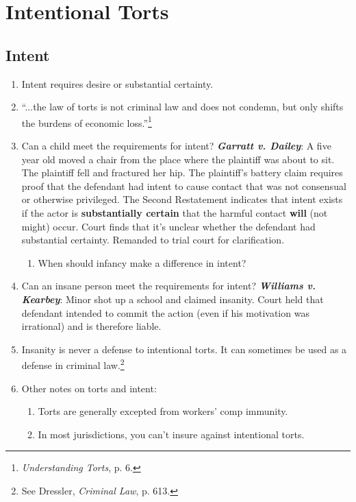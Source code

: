 \section{Intentional Torts}

\subsection{Intent}

\begin{enumerate}
    \item Intent requires desire or substantial certainty.
    \item ``...the law of torts is not criminal law and does not condemn, but only shifts the burdens of economic loss.''\footnote{\emph{Understanding Torts}, p. 6.}
    \item Can a child meet the requirements for intent? \textbf{\emph{Garratt v. Dailey}}: A five year old moved a chair from the place where the plaintiff was about to sit. The plaintiff fell and fractured her hip. The plaintiff's battery claim requires proof that the defendant had intent to cause contact that was not consensual or otherwise privileged. The Second Restatement indicates that intent exists if the actor is \textbf{substantially certain} that the harmful contact \textbf{will} (not might) occur. Court finds that it's unclear whether the defendant had substantial certainty. Remanded to trial court for clarification.
        \begin{enumerate}
            \item When should infancy make a difference in intent?
        \end{enumerate}
    \item Can an insane person meet the requirements for intent? \textbf{\emph{Williams v. Kearbey}}: Minor shot up a school and claimed insanity. Court held that defendant intended to commit the action (even if his motivation was irrational) and is therefore liable.
        \item Insanity is never a defense to intentional torts. It can sometimes be used as a defense in criminal law.\footnote{See Dressler, \emph{Criminal Law}, p. 613.}
    \item Other notes on torts and intent:
    \begin{enumerate}
        \item Torts are generally excepted from workers' comp immunity.
        \item In most jurisdictions, you can't insure against intentional torts.

\end{enumerate}
\end{enumerate}
